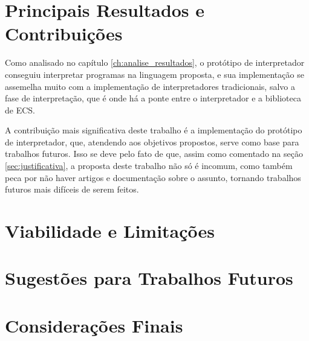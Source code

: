 \section{Principais Resultados e Contribuições}

Como analisado no capítulo \ref{ch:analise_resultados}, o protótipo de interpretador conseguiu interpretar programas na linguagem proposta, e sua implementação se assemelha muito com a implementação de interpretadores tradicionais, salvo a fase de interpretação, que é onde há a ponte entre o interpretador e a biblioteca de ECS.

A contribuição mais significativa deste trabalho é a implementação do protótipo de interpretador, que, atendendo aos objetivos propostos, serve como base para trabalhos futuros. Isso se deve pelo fato de que, assim como comentado na seção \ref{sec:justificativa}, a proposta deste trabalho não só é incomum, como também peca por não haver artigos e documentação sobre o assunto, tornando trabalhos futuros mais difíceis de serem feitos.

\section{Viabilidade e Limitações}

\section{Sugestões para Trabalhos Futuros}

\section{Considerações Finais}
